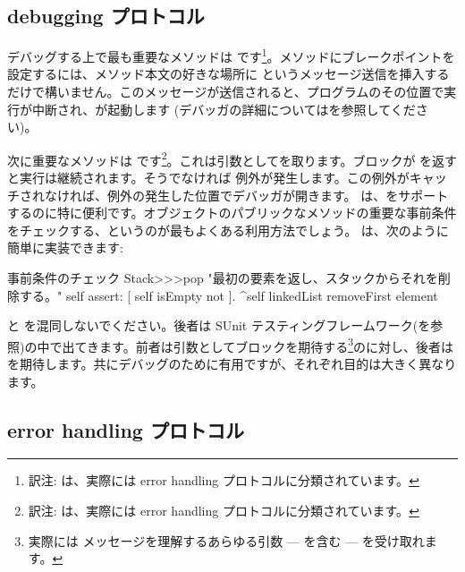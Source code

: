 \documentclass[a4paper,10pt,twoside]{book}
\begin{document}

\subsection{debugging プロトコル}

デバッグする上で最も重要なメソッドは  です\footnote{訳注:  は、実際には error handling プロトコルに分類されています。}。メソッドにブレークポイントを設定するには、メソッド本文の好きな場所に  というメッセージ送信を挿入するだけで構いません。このメッセージが送信されると、プログラムのその位置で実行が中断され、が起動します
(デバッガの詳細についてはを参照してください)。


次に重要なメソッドは  です\footnote{訳注:  は、実際には error handling プロトコルに分類されています。}。これは引数としてを取ります。ブロックが  を返すと実行は継続されます。そうでなければ  例外が発生します。この例外がキャッチされなければ、例外の発生した位置でデバッガが開きます。 は、をサポートするのに特に便利です。オブジェクトのパブリックなメソッドの重要な事前条件をチェックする、というのが最もよくある利用方法でしょう。 は、次のように簡単に実装できます:%

\begin{method}{事前条件のチェック}
Stack>>>pop
    "最初の要素を返し、スタックからそれを削除する。"
    self assert: [ self isEmpty not ].
    ^self linkedList removeFirst element
\end{method}

 と  を混同しないでください。後者は SUnit テスティングフレームワーク(を参照)の中で出てきます。前者は引数としてブロックを期待する\footnote{実際には  メッセージを理解するあらゆる引数 ---  を含む --- を受け取れます。}のに対し、後者は  を期待します。共にデバッグのために有用ですが、それぞれ目的は大きく異なります。

\subsection{error handling プロトコル}
\end{document}
